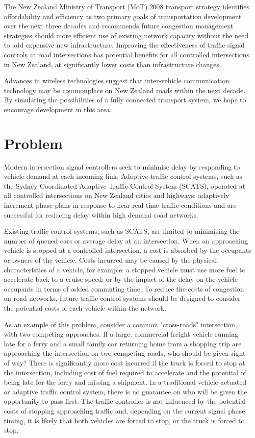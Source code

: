 The New Zealand Ministry of Transport (MoT) 2008 transport strategy identifies affordability and efficiency as two primary goals of transportation development over the next three decades and recommends future congestion management strategies should more efficient use of existing network capacity without the need to add expensive new infrastructure. Improving the effectiveness of traffic signal controls at road intersections has potential benefits for all controlled intersections in New Zealand, at significantly lower costs than infrastructure changes.

Advances in wireless technologies suggest that inter-vehicle communication technology may be commonplace on New Zealand roads within the next decade. By simulating the possibilities of a fully connected transport system, we hope to encourage development in this area.

\section{Problem}

Modern intersection signal controllers seek to minimise delay by responding to vehicle demand at each incoming link. Adaptive traffic control systems, such as the Sydney Coordinated Adaptive Traffic Control System (SCATS), operated at all controlled intersections on New Zealand cities and highways; adaptively increment phase plans in response to near-real time traffic conditions and are successful for reducing delay within high demand road networks. 

Existing traffic control systems, such as SCATS, are limited to minimising the number of queued cars or average delay at an intersection. When an approaching vehicle is stopped at a controlled intersection, a cost is absorbed by the occupants or owners of the vehicle. Costs incurred may be caused by the physical characteristics of a vehicle, for example: a stopped vehicle must use more fuel to accelerate back to a cruise speed; or by the impact of the delay on the vehicle occupants in terms of added commuting time. To reduce the costs of congestion on road networks, future traffic control systems should be designed to consider the potential costs of each vehicle within the network.

As an example of this problem, consider a common "cross-roads" intersection, with two competing approaches. If a large, commercial freight vehicle running late for a ferry and a small family car returning home from a shopping trip are approaching the intersection on two competing roads, who should be given right of way? There is significantly more cost incurred if the truck is forced to stop at the intersection, including cost of fuel required to accelerate and the potential of being late for the ferry and missing a shipment. In a traditional vehicle actuated or adaptive traffic control system, there is no guarantee on who will be given the opportunity to pass first. The traffic controller is not influenced by the potential costs of stopping approaching traffic and, depending on the current signal phase timing, it is likely that both vehicles are forced to stop, or the truck is forced to stop. 

